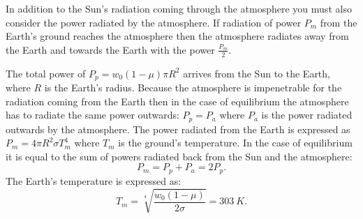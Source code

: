 \hinteng
In addition to the Sun’s radiation coming through the atmosphere you must also consider the power radiated by the atmosphere. If radiation of power $P_m$ from the Earth’s ground reaches the atmosphere then the atmosphere radiates away from the Earth and towards the Earth with the power $\frac{P_m}{2}$.

\solueng
The total power of $P_p=w_0 \left(1-\mu\right)\pi R^2$ arrives from the Sun to the Earth, where $R$ is the Earth’s radius. Because the atmosphere is impenetrable for the radiation coming from the Earth then in the case of equilibrium the atmosphere has to radiate the same power outwards: $P_p=P_a$ where $P_a$ is the power radiated outwards by the atmosphere. The power radiated from the Earth is expressed as $P_m=4 \pi R^2 \sigma T_m^4$ where $T_m$ is the ground’s temperature. In the case of equilibrium it is equal to the sum of powers radiated back from the Sun and the atmosphere:
\[P_m=P_p+P_a=2P_p.\]
The Earth’s temperature is expressed as:
\[T_m=\sqrt[4]{\frac{w_0\left(1-\mu\right)}{2\sigma}}=\SI{303}{K}.\]
\probend